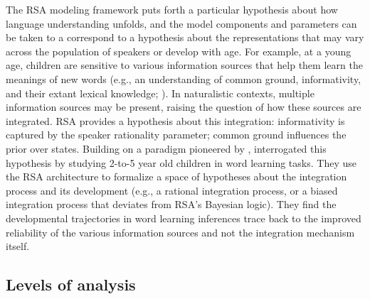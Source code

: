 \documentclass{sp}
\newcommand{\gcs}[1]{\textcolor{blue}{[gcs: #1]}}
\newcommand{\mf}[1]{\textcolor{orange}{[mf: #1]}}
\newcommand{\mht}[1]{\textcolor{purple}{[mht: #1]}}
\begin{document}
The RSA modeling framework puts forth a particular hypothesis about how language understanding unfolds, and the model components and parameters can be taken to a correspond to a hypothesis about the representations that may vary across the population of speakers or develop with age. 
For example, at a young age, children are sensitive to various information sources that help them learn the meanings of new words (e.g., an understanding of common ground, informativity, and their extant lexical knowledge; \citealp{markman1988children, schulze2013, akhtar1996role}).
In naturalistic contexts, multiple information sources may be present, raising the question of how these sources are integrated.
RSA provides a hypothesis about this integration: informativity is captured by the speaker rationality parameter; common ground influences the prior over states.
Building on a paradigm pioneered by \cite{frank2014inferring},
\cite{bohn2019predicting, bohn2019integrating} interrogated this hypothesis by studying 2-to-5 year old children in word learning tasks. 
They use the RSA architecture to formalize a space of hypotheses about the integration process and its development (e.g., a rational integration process, or a biased integration process that deviates from RSA's Bayesian logic).
They find the developmental trajectories in word learning inferences trace back to the improved reliability of the various information sources and not the integration mechanism itself.






\subsection{Levels of analysis}

\end{document}
